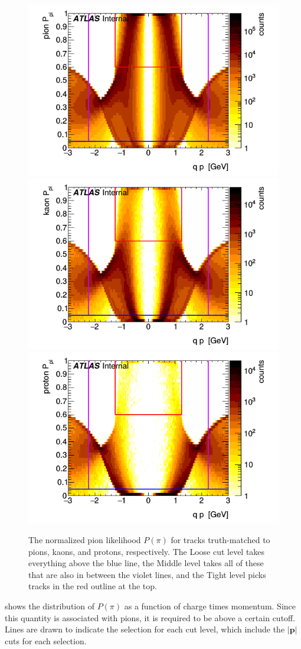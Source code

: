 \begin{figure}[t]
\begin{minipage}[t]{1.0\textwidth}
\centering
\includegraphics[width=.32\linewidth]{P_pion_pi.png}
\includegraphics[width=.32\linewidth]{P_kaon_pi.png}
\includegraphics[width=.32\linewidth]{P_proton_pi.png}
\end{minipage}
\caption{The normalized pion likelihood $P(\pi)$ for tracks truth-matched to pions, kaons, and protons, respectively. The Loose cut level takes everything above the blue line, the Middle level takes all of these that are also in between the violet lines, and the Tight level picks tracks in the red outline at the top.}
\label{fig:prob_pi}
\end{figure}

 shows the distribution of $P(\pi)$ as a function of charge times momentum.
Since this quantity is associated with pions, it is required to be above a certain cutoff.
Lines are drawn to indicate the selection for each cut level, which include the $\left|\mathbf{p}\right|$ cuts for each selection.

